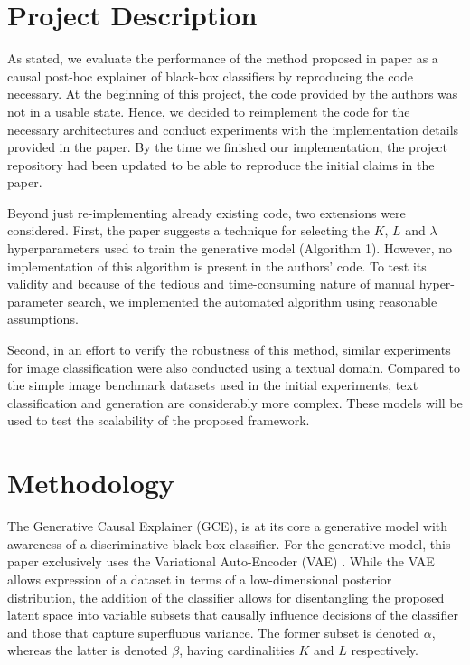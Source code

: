 \section{Project Description}
As stated, we evaluate the performance of the method proposed in paper\cite{oshaughnessy2020generative} as a causal post-hoc explainer of black-box classifiers by reproducing the code necessary. At the beginning of this project, the code provided by the authors was not in a usable state. Hence, we decided to reimplement the code for the necessary architectures and conduct experiments with the implementation details provided in the paper. By the time we finished our implementation, the project repository had been updated to be able to reproduce the initial claims in the paper. %

Beyond just re-implementing already existing code, two extensions were considered. First, the paper suggests a technique for selecting the $K$, $L$ and $\lambda$ hyperparameters used to train the generative model (Algorithm 1). However, no implementation of this algorithm is present in the authors' code. To test its validity and because of the tedious and time-consuming nature of manual hyper-parameter search, we implemented the automated algorithm using reasonable assumptions.

Second, in an effort to verify the robustness of this method, similar experiments for image classification were also conducted using a textual domain. Compared to the simple image benchmark datasets used in the initial experiments, text classification and generation are considerably more complex. These models will be used to test the scalability of the proposed framework.


\section{Methodology}

The Generative Causal Explainer (GCE), is at its core a generative model with awareness of a discriminative black-box classifier. For the generative model, this paper exclusively uses the Variational Auto-Encoder (VAE) \cite{kingma2014autoencoding}. While the VAE allows expression of a dataset in terms of a low-dimensional posterior distribution, the addition of the classifier allows for disentangling the proposed latent space into variable subsets that causally influence decisions of the classifier and those that capture superfluous variance. The former subset is denoted $\alpha$, whereas the latter is denoted  $\beta$, having cardinalities $K$ and $L$ respectively. 

